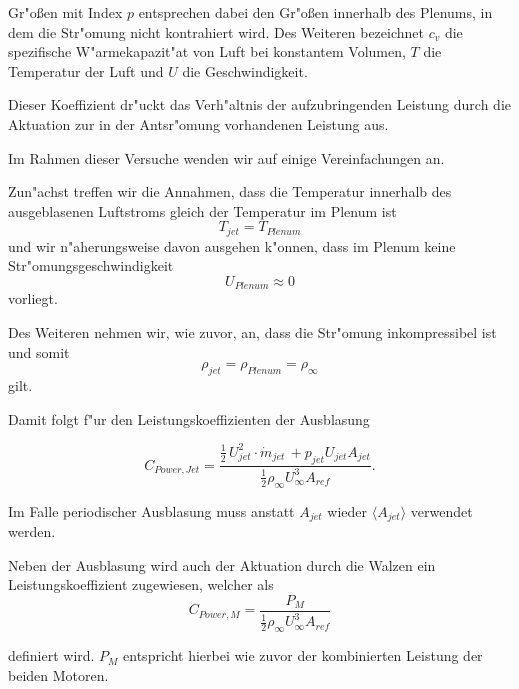 Gr"o\ss{}en mit Index $p$ entsprechen dabei den Gr"o\ss{}en innerhalb des Plenums, in dem die Str"omung nicht kontrahiert wird.
Des Weiteren bezeichnet $c_v$ die spezifische W"armekapazit"at von Luft bei konstantem Volumen, $T$ die Temperatur der Luft und $U$ die Geschwindigkeit.

Dieser Koeffizient dr"uckt das Verh"altnis der aufzubringenden Leistung durch die Aktuation zur in der Antsr"omung vorhandenen Leistung aus.

Im Rahmen dieser Versuche wenden wir auf  einige Vereinfachungen an. 

Zun"achst treffen wir die Annahmen, dass die Temperatur innerhalb des ausgeblasenen Luftstroms gleich der Temperatur im Plenum ist
	\begin{equation}
	\label{eq:T-Vereinfachung}
		T_{jet} = T_{Plenum}
	\end{equation}
und wir n"aherungsweise davon ausgehen k"onnen, dass im Plenum keine Str"omungsgeschwindigkeit 
	\begin{equation}
	\label{eq:Up}
		U_{Plenum} \approx 0
	\end{equation}
vorliegt.

Des Weiteren nehmen wir, wie zuvor, an, dass die Str"omung inkompressibel ist und somit
	\begin{equation}
	\label{eq:Inkompressibilitaet}
		\rho_{jet} = \rho_{Plenum} = \rho_{\infty}
	\end{equation}
gilt.

Damit folgt f"ur den Leistungskoeffizienten der Ausblasung

	\begin{equation}
	\label{eq:CPowerJ vereinfacht}
		C_{Power,Jet} = \frac{\frac{1}{2}\,U^2_{jet} \cdot \dot{m}_{jet} \, + p_{jet}U_{jet}A_{jet}}{\frac{1}{2}\rho_{\infty}U^3_{\infty}A_{ref}}.
	\end{equation}

Im Falle periodischer Ausblasung muss anstatt $A_{jet}$ wieder $\langle{A_{jet}}\rangle$ verwendet werden.

Neben der Ausblasung wird auch der Aktuation durch die Walzen ein Leistungskoeffizient zugewiesen, welcher als
		\begin{equation}
		\label{eq:def-CPowerM}
			C_{Power,M} = \frac{P_M}{\frac{1}{2}\rho_{\infty}U^3_{\infty}A_{ref}}
		\end{equation}
		
definiert wird.
$P_M$ entspricht hierbei wie zuvor der kombinierten Leistung der beiden Motoren.
